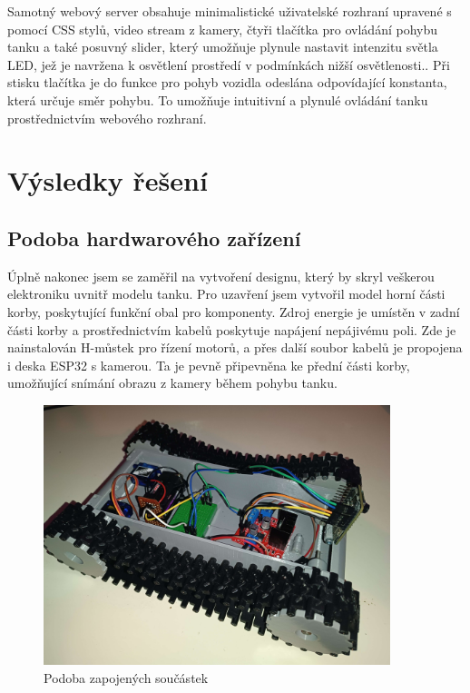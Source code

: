 \documentclass[12pt, a4paper,
oneside
openany
]{report}
\begin{document}
\noindent Samotný webový server obsahuje minimalistické uživatelské rozhraní upravené s pomocí CSS stylů, video stream z kamery, čtyři tlačítka pro ovládání pohybu tanku a také posuvný slider, který umožňuje plynule nastavit intenzitu světla LED, jež je navržena k osvětlení prostředí v podmínkách nižší osvětlenosti.. Při stisku tlačítka je do funkce pro pohyb vozidla odeslána odpovídající konstanta, která určuje směr pohybu. To umožňuje intuitivní a plynulé ovládání tanku prostřednictvím webového rozhraní.
 

	\chapter{Výsledky řešení}

    \section{Podoba hardwarového zařízení}
\noindent Úplně nakonec jsem se zaměřil na vytvoření designu, který by skryl veškerou elektroniku uvnitř modelu tanku. Pro uzavření jsem vytvořil model horní části korby, poskytující funkční obal pro komponenty. Zdroj energie je umístěn v zadní části korby a prostřednictvím kabelů poskytuje napájení nepájivému poli. Zde je nainstalován H-můstek pro řízení motorů, a přes další soubor kabelů je propojena i deska ESP32 s kamerou. Ta je pevně připevněna ke přední části korby, umožňující snímání obrazu z kamery během pohybu tanku.

	\begin{figure}[h]
		\centering 
		\includegraphics[width=0.9\textwidth]{image/tank.jpg} %
		\caption{Podoba zapojených součástek} 
	\end{figure}
\end{document}
